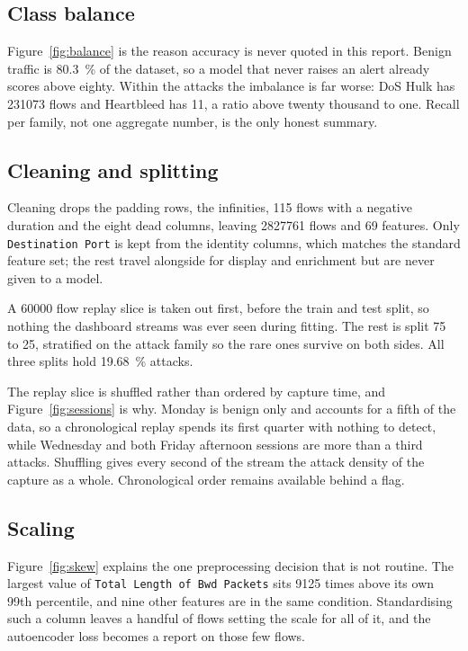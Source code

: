 \documentclass[9pt,a4paper,twocolumn]{article}
\begin{document}
\subsection{Class balance}

Figure~\ref{fig:balance} is the reason accuracy is never quoted in this report.
Benign traffic is \SI{80.3}{\percent} of the dataset, so a model that never
raises an alert already scores above eighty. Within the attacks the imbalance is
far worse: DoS Hulk has \num{231073} flows and Heartbleed has 11, a ratio above
twenty thousand to one. Recall per family, not one aggregate number, is the only
honest summary.

\subsection{Cleaning and splitting}

Cleaning drops the padding rows, the infinities, \num{115} flows with a negative
duration and the eight dead columns, leaving \num{2827761} flows and 69
features. Only \texttt{Destination Port} is kept from the identity columns,
which matches the standard feature set; the rest travel alongside for display
and enrichment but are never given to a model.

A \num{60000} flow replay slice is taken out first, before the train and test
split, so nothing the dashboard streams was ever seen during fitting. The rest
is split 75 to 25, stratified on the attack family so the rare ones survive on
both sides. All three splits hold \SI{19.68}{\percent} attacks.

The replay slice is shuffled rather than ordered by capture time, and
Figure~\ref{fig:sessions} is why. Monday is benign only and accounts for a
fifth of the data, so a chronological replay spends its first quarter with
nothing to detect, while Wednesday and both Friday afternoon sessions are more
than a third attacks. Shuffling gives every second of the stream the attack
density of the capture as a whole. Chronological order remains available behind
a flag.

\subsection{Scaling}

Figure~\ref{fig:skew} explains the one preprocessing decision that is not
routine. The largest value of \texttt{Total Length of Bwd Packets} sits
\num{9125} times above its own 99th percentile, and nine other features are in
the same condition. Standardising such a column leaves a handful of flows
setting the scale for all of it, and the autoencoder loss becomes a report on
those few flows.
\end{document}
